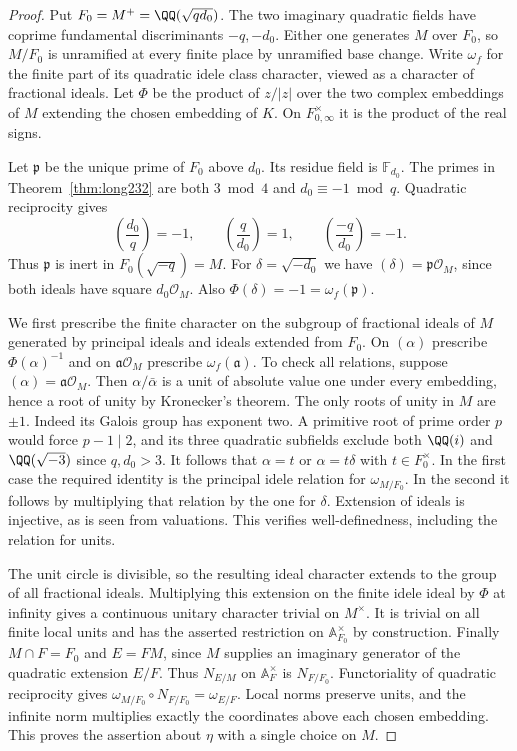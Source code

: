 \documentclass[a4paper,11pt]{article}
\theoremstyle{definition}
\theoremstyle{remark}
\numberwithin{equation}{section}
\begin{document}
\begin{proof}
Put \(F_0=M^+=\QQ(\sqrt{q d_0})\). The two imaginary quadratic
fields have coprime fundamental discriminants \(-q,-d_0\).
Either one generates \(M\) over \(F_0\), so \(M/F_0\) is
unramified at every finite place by unramified base change.
Write \(\omega_f\) for the finite part of its quadratic idele
class character, viewed as a character of fractional ideals.
Let \(\Phi\) be the product of \(z/|z|\) over the two complex
embeddings of \(M\) extending the chosen embedding of \(K\).
On \(F_{0,\infty}^\times\) it is the product of the real signs.

Let \(\mathfrak p\) be the unique prime of \(F_0\) above \(d_0\).
Its residue field is \(\mathbb F_{d_0}\). The primes in
Theorem~\ref{thm:long232} are both \(3\bmod4\) and
\(d_0\equiv-1\bmod q\). Quadratic reciprocity gives
\[
 \left(\frac{d_0}{q}\right)=-1,\qquad
 \left(\frac{q}{d_0}\right)=1,\qquad
 \left(\frac{-q}{d_0}\right)=-1 .
\]
Thus \(\mathfrak p\) is inert in \(F_0(\sqrt{-q})=M\).
For \(\delta=\sqrt{-d_0}\) we have
\((\delta)=\mathfrak p\mathcal O_M\), since both ideals have
square \(d_0\mathcal O_M\). Also
\(\Phi(\delta)=-1=\omega_f(\mathfrak p)\).

We first prescribe the finite character on the subgroup of
fractional ideals of \(M\) generated by principal ideals and
ideals extended from \(F_0\). On \((\alpha)\) prescribe
\(\Phi(\alpha)^{-1}\) and on
\(\mathfrak a\mathcal O_M\) prescribe \(\omega_f(\mathfrak a)\).
To check all relations, suppose \((\alpha)=\mathfrak a\mathcal O_M\).
Then \(\alpha/\bar\alpha\) is a unit of absolute value one under
every embedding, hence a root of unity by Kronecker's theorem.
The only roots of unity in \(M\) are \(\pm1\). Indeed its Galois
group has exponent two. A primitive root of prime order \(p\)
would force \(p-1\mid2\), and its three quadratic subfields exclude
both \(\QQ(i)\) and \(\QQ(\sqrt{-3})\) since \(q,d_0>3\).
It follows that \(\alpha=t\) or \(\alpha=t\delta\) with
\(t\in F_0^\times\). In the first case the required identity is
the principal idele relation for \(\omega_{M/F_0}\). In the second
it follows by multiplying that relation by the one for \(\delta\).
Extension of ideals is injective, as is seen from valuations.
This verifies well-definedness, including the relation for units.

The unit circle is divisible, so the resulting ideal character
extends to the group of all fractional ideals. Multiplying this
extension on the finite idele ideal by \(\Phi\) at infinity gives
a continuous unitary character trivial on \(M^\times\). It is
trivial on all finite local units and has the asserted restriction
on \(\mathbb A_{F_0}^\times\) by construction.
Finally \(M\cap F=F_0\) and \(E=FM\), since \(M\) supplies an
imaginary generator of the quadratic extension \(E/F\). Thus
\(N_{E/M}\) on \(\mathbb A_F^\times\) is \(N_{F/F_0}\).
Functoriality of quadratic reciprocity gives
\(\omega_{M/F_0}\circ N_{F/F_0}=\omega_{E/F}\). Local norms
preserve units, and the infinite norm multiplies exactly the
coordinates above each chosen embedding. This proves the
assertion about \(\eta\) with a single choice on \(M\).


\end{proof}
\end{document}
